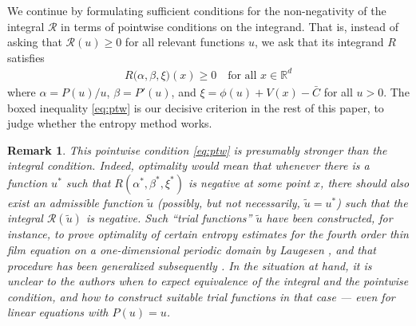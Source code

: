 \documentclass[reqno]{amsart}
\newtheorem{remark}[lemma]{Remark}
\newcommand{\R}{\mathbb{R}}
\begin{document}
We continue by formulating sufficient conditions for the non-negativity of the integral $\mathcal R$ in terms of pointwise conditions on the integrand. That is, instead of asking that $\mathcal R(u)\ge 0$ for all relevant functions $u$, we ask that its integrand $R$ satisfies 
\begin{align}
  \label{eq:ptw}
\boxed{  R\big(\alpha,\beta,\xi\big)(x)\ge 0  \quad \text{for all $x\in\R^d$}} 
\end{align}
where $\alpha=P(u)/u$, $\beta=P'(u)$, and $\xi=\phi(u)+V(x)-\bar C$ for all $u>0$. The boxed inequality \eqref{eq:ptw} is our decisive criterion in the rest of this paper, to judge whether the entropy method works.

\begin{remark}
This pointwise condition \eqref{eq:ptw} is presumably stronger than the integral condition.
Indeed, optimality would mean that whenever there is a function $u^*$ such that $R(\alpha^*,\beta^*,\xi^*)$ is negative \emph{at some point $x$}, there should also exist an admissible function $\tilde u$ (possibly, but not necessarily, $\tilde u=u^*$) such that the integral $\mathcal R(\tilde u)$ is negative. Such ``trial functions'' $\tilde u$ have been constructed, for instance, 
to prove optimality of certain entropy estimates for the fourth order thin film equation on a one-dimensional periodic domain by Laugesen \cite{laugesen}, and that procedure has been generalized subsequently \cite{JM}. In the situation at hand, it is unclear to the authors when to expect equivalence of the integral and the pointwise condition, and how to construct suitable trial functions in that case --- even for linear equations with $P(u)=u$.
\end{remark}
\end{document}
